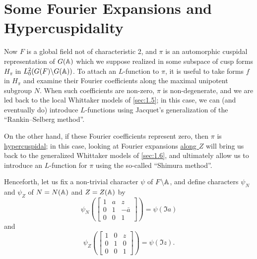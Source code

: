 \section{Some Fourier Expansions and Hypercuspidality}
\label{sec:2}


Now $F$ is a global field not of characteristic 2, and $\pi$ is an automorphic cuspidal representation of $G(\mathbb{A})$ which we suppose realized in some subspace of cusp forms $H_\pi$ in $L_0^2(G(F) \backslash G(\mathbb{A}))$.
To attach an $L$-function to $\pi$, it is useful to take forms $f$ in $H_\pi$ and examine their Fourier coefficients along the maximal unipotent subgroup $N$.
When such coefficients are non-zero, $\pi$ is non-degenerate, and we are led back to the local Whittaker models of \ref{sec:1.5}; in this case, we can (and eventually do) introduce $L$-functions using Jacquet's generalization of the ``Rankin--Selberg method''.


On the other hand, if these Fourier coefficients represent zero, then $\pi$ is \underline{hypercuspidal}; in this case, looking at Fourier expansions \underline{along $Z$} will bring us back to the generalized Whittaker models of \ref{sec:1.6}, and ultimately allow us to introduce an $L$-function for $\pi$ using the so-called ``Shimura method''.


Henceforth, let us fix a non-trivial character $\psi$ of $F \backslash \mathbb{A}$, and define characters $\psi_N$ and $\psi_Z$ of $N = N(\mathbb{A})$ and $Z = Z(\mathbb{A})$ by
\[
    \psi_N \left(\begin{bmatrix}
        1 & a & z \\ 0 & 1& -\bar{a} \\ 0 &0 & 1
    \end{bmatrix}\right) = \psi(\Im a)
\]
and
\[
    \psi_Z \left(\begin{bmatrix}
        1 & 0 & z \\ 0 & 1& 0 \\ 0 & 0 & 1
    \end{bmatrix}\right) = \psi(\Im z).
\]


\subsection{}
\label{sec:2.1}


